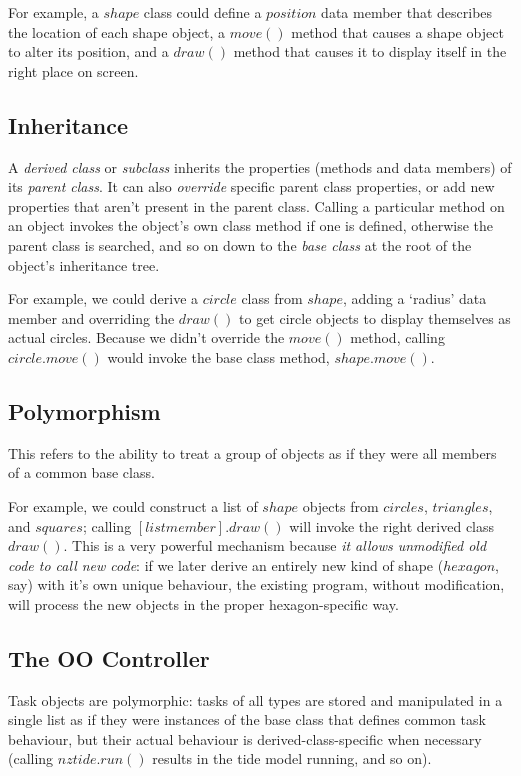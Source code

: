 \documentclass[a4paper,12pt]{amsart}
\begin{document}
For example, a $shape$ class could define a $position$ data member that
describes the location of each shape object, a $move()$ method that
causes a shape object to alter its position, and a $draw()$ method that
causes it to display itself in the right place on screen.

\subsection{Inheritance}

A {\em derived class} or {\em subclass} inherits the properties (methods
and data members) of its {\em parent class}. It can also {\em override}
specific parent class properties, or add new properties that aren't
present in the parent class. Calling a particular method on an object
invokes the object's own class method if one is defined, otherwise the
parent class is searched, and so on down to the {\em base class} at the
root of the object's inheritance tree. 

For example, we could derive a $circle$ class from $shape$, adding a
`radius' data member and overriding the $draw()$ to get circle objects
to display themselves as actual circles.  Because we didn't override the
$move()$ method, calling $circle.move()$ would invoke the base class
method, $shape.move()$. 


\subsection{Polymorphism}

This refers to the ability to treat a group of objects as if they were
all members of a common base class.

For example, we could construct a list of $shape$ objects from
$circles$, $triangles$, and $squares$; calling $[list member].draw()$
will invoke the right derived class $draw()$. This is a very powerful
mechanism because {\em it allows unmodified old code to call new code}:
if we later derive an entirely new kind of shape ($hexagon$, say) with
it's own unique behaviour, the existing program, without modification,
will process the new objects in the proper hexagon-specific way.

\subsection{The OO Controller}

Task objects are polymorphic: tasks of all types are stored and
manipulated in a single list as if they were instances of the base class
that defines common task behaviour, but their actual behaviour is
derived-class-specific when necessary (calling $nztide.run()$ results in
the tide model running, and so on). 
\end{document}
